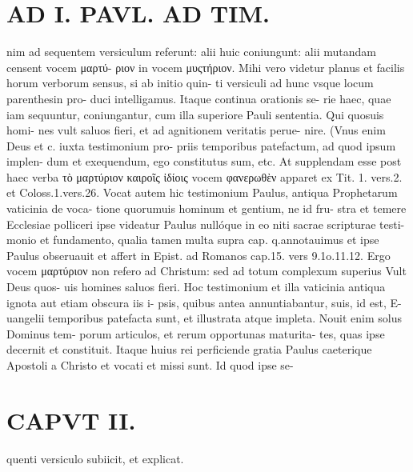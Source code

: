 \documentclass{article}
\begin{document}
\begin{pages}
\section*{AD I. PAVL. AD TIM. }
\marginpar{[ p.62 ]}\pstart nim ad sequentem versiculum referunt: alii huic coniungunt: alii mutandam censent vocem μαρτύ- ριον in vocem μυςτήριον. Mihi vero videtur planus et facilis horum verborum sensus, si ab initio quin- ti versiculi ad hunc vsque locum parenthesin pro- duci intelligamus. Itaque continua orationis se- rie haec, quae iam sequuntur, coniungantur, cum illa superiore Pauli sententia. Qui quosuis homi- nes vult saluos fieri, et ad agnitionem veritatis perue- nire. (Vnus enim Deus et c. iuxta testimonium pro- priis temporibus patefactum, ad quod ipsum implen- dum et exequendum, ego constitutus sum, etc. At supplendam esse post haec verba τὸ μαρτύριον καιροῖς ἰδίοις vocem φανερωθὲν apparet ex Tit. 1. vers.2. et Coloss.1.vers.26. Vocat autem hic testimonium Paulus, antiqua Prophetarum vaticinia de voca- tione quorumuis hominum et gentium, ne id fru- stra et temere Ecclesiae polliceri ipse videatur Paulus nullóque in eo niti sacrae scripturae testi- monio et fundamento, qualia tamen multa supra cap. q.annotauimus et ipse Paulus obseruauit et affert in Epist. ad Romanos cap.15. vers 9.1o.11.12. Ergo vocem μαρτύριον non refero ad Christum: sed ad totum complexum superius Vult Deus quos- uis homines saluos fieri. Hoc testimonium et illa vaticinia antiqua ignota aut etiam obscura iis i- psis, quibus antea annuntiabantur, suis, id est, E- uangelii temporibus patefacta sunt, et illustrata atque impleta. Nouit enim solus Dominus tem- porum articulos, et rerum opportunas maturita- tes, quas ipse decernit et constituit. Itaque huius rei perficiende gratia Paulus caeterique  Apostoli a Christo et vocati et missi sunt. Id quod ipse se-  \pend
\section*{CAPVT II. }\pstart quenti versiculo subiicit, et explicat.  \pend
{}
{}

\end{pages}
\end{document}
